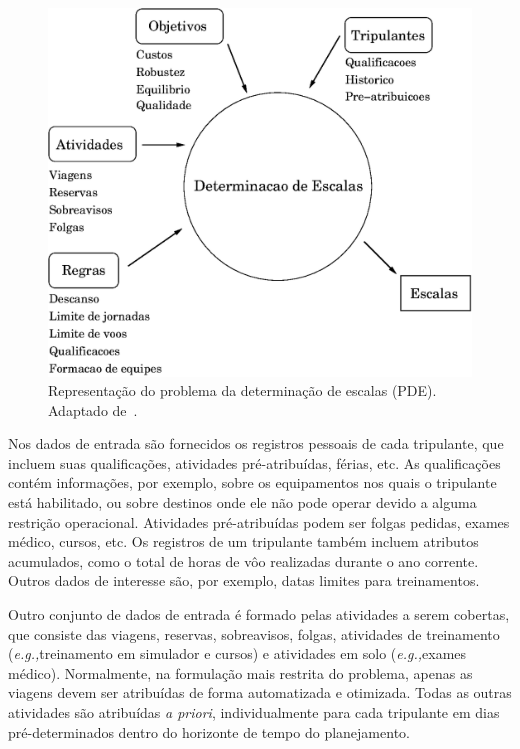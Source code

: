 \documentclass[12pt,a4paper]{article}
\newcommand{\eg}{\emph{e.g.,}}                               %
\begin{document}
\begin{figure}[htbp]
	\begin{center}
		\includegraphics[scale=0.5]{fig/pde.eps}
		\caption{Representação do problema da determinação de escalas (PDE). Adaptado de~\cite{kohl04}.} 
		\label{fig:pde}
	\end{center}
\end{figure}

Nos dados de entrada são fornecidos os registros pessoais de cada tripulante, que incluem suas
qualificações, atividades pré-atribuídas, férias, etc. As qualificações contém informações, por
exemplo, sobre os equipamentos nos quais o tripulante está habilitado, ou sobre destinos onde ele
não pode operar devido a alguma restrição operacional. Atividades pré-atribuídas podem ser
folgas pedidas, exames médico, cursos, etc. Os registros de um tripulante também incluem atributos
acumulados, como o total de horas de vôo realizadas durante o ano corrente. Outros dados de
interesse são, por exemplo, datas limites para treinamentos.

Outro conjunto de dados de entrada é formado pelas atividades a serem cobertas, que consiste das
viagens, reservas, sobreavisos, folgas, atividades de treinamento (\eg treinamento em simulador e
cursos) e atividades em solo (\eg exames médico). Normalmente, na formulação mais restrita do
problema, apenas as viagens devem ser atribuídas de forma automatizada e otimizada. Todas as outras
atividades são atribuídas \emph{a priori}, individualmente para cada tripulante em dias
pré-determinados dentro do horizonte de tempo do planejamento.
\end{document}
